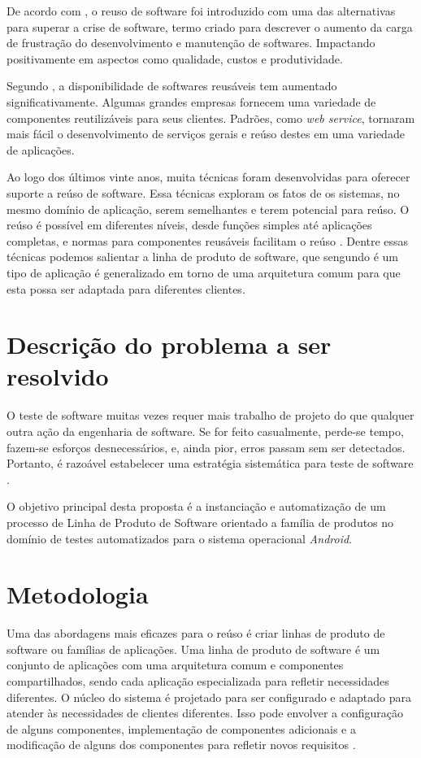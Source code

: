 \documentclass[12pt,a4paper]{article}
\begin{document}
De acordo com \cite{sametinger1997}, o reuso de software foi introduzido com uma das alternativas para superar a crise de software, termo criado para descrever o aumento da carga de frustração do desenvolvimento e manutenção de softwares. Impactando positivamente em aspectos como qualidade, custos e produtividade.

Segundo \cite{Sommerville2011}, a disponibilidade de softwares reusáveis tem aumentado significativamente. Algumas grandes empresas fornecem uma variedade de componentes reutilizáveis para seus clientes. Padrões, como \textit{web service}, tornaram mais fácil o desenvolvimento de serviços gerais e reúso destes em uma variedade de aplicações.

Ao logo dos últimos vinte anos, muita técnicas foram desenvolvidas para oferecer suporte a reúso de software. Essa técnicas exploram os fatos de os sistemas, no mesmo domínio de aplicação, serem semelhantes e terem potencial para reúso. O reúso é possível em diferentes níveis, desde funções simples até aplicações completas, e normas para componentes reusáveis facilitam o reúso \cite{Sommerville2011}. Dentre essas técnicas podemos salientar a linha de produto de software, que sengundo \cite{Sommerville2011} é um tipo de aplicação é generalizado em torno de uma arquitetura comum para que esta possa ser adaptada para diferentes clientes.

\section{Descrição do problema a ser resolvido}
O teste de software muitas vezes requer mais trabalho de projeto do que qualquer outra ação da engenharia de software. Se for feito casualmente, perde-se tempo, fazem-se esforços desnecessários, e, ainda pior, erros passam sem ser detectados. Portanto, é razoável estabelecer uma estratégia sistemática para teste de software \cite{pressman2011}.

O objetivo principal desta proposta é a instanciação e automatização de um processo de Linha de Produto de Software orientado a família de produtos no domínio de testes automatizados para o sistema operacional \textit{Android}.
\section{Metodologia}
Uma das abordagens mais eficazes para o reúso é criar linhas de produto de software ou famílias de aplicações. Uma linha de produto de software é um conjunto de aplicações com uma arquitetura comum e componentes compartilhados, sendo cada aplicação especializada para refletir necessidades diferentes. O núcleo do sistema é projetado para ser configurado e adaptado para atender às necessidades de clientes diferentes. Isso pode envolver a configuração de alguns componentes, implementação de componentes adicionais e a modificação de alguns dos componentes para refletir novos requisitos \cite{Sommerville2011}.
\end{document}
